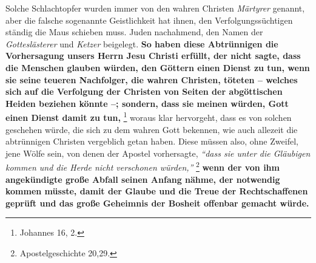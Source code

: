 Solche Schlachtopfer wurden immer von den wahren Christen
\textit{Märtyrer} genannt,
aber die falsche sogenannte Geistlichkeit hat ihnen, den Verfolgungssüchtigen
ständig die Maus schieben muss.
Juden nachahmend, den Namen der
\textit{Gotteslästerer} und
\textit{Ketzer} beigelegt. 
\textbf{So haben diese Abtrünnigen die Vorhersagung
unsers Herrn Jesu Christi erfüllt, der nicht sagte, dass die Menschen glauben
würden, den Göttern einen Dienst zu tun, wenn sie seine teueren Nachfolger, die
wahren Christen, töteten
-- welches sich auf die Verfolgung der Christen von Seiten der abgöttischen
Heiden beziehen könnte --; sondern, dass sie meinen
würden, Gott einen Dienst
damit zu tun,}
\footnote{Johannes 16, 2.}
woraus klar hervorgeht, dass es von solchen
geschehen würde, die sich zu dem wahren Gott bekennen, wie auch allezeit die
abtrünnigen Christen vergeblich getan haben. Diese müssen also, ohne Zweifel,
jene Wölfe sein, von denen der Apostel vorhersagte,
\textit{"`dass sie unter die
Gläubigen kommen und die Herde nicht verschonen würden,"'}
\footnote{Apostelgeschichte 20,29.}
\textbf{wenn der von ihm angekündigte große Abfall seinen Anfang nähme, der
notwendig kommen müsste, damit der Glaube und die Treue der
Rechtschaffenen
geprüft und das große Geheimnis der Bosheit offenbar gemacht würde.}

\medskip

